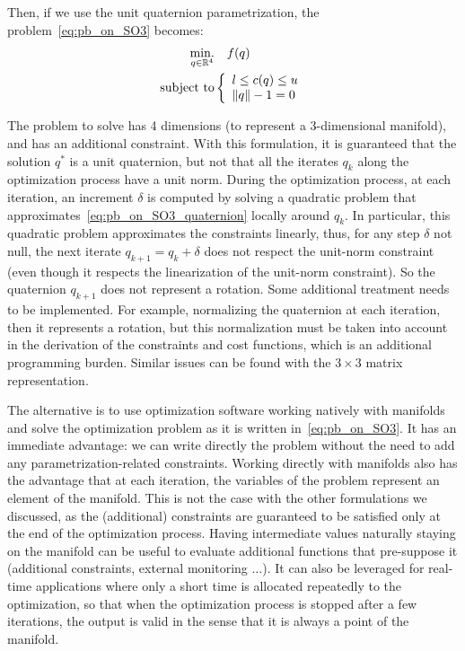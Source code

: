 Then, if we use the unit quaternion parametrization, the problem~\ref{eq:pb_on_SO3} becomes:
\begin{align}
\label{eq:pb_on_SO3_quaternion}
  \operatorname*{min.}_{q \in \mathbb{R}^4} & \quad f(q)\\
  \text{subject to}&
  \left\{\begin{array}{lr}
    {l} \leq c(q) \leq {u} \nonumber\\
    \|q\| - 1 = 0
  \end{array}\right.
\end{align}

The problem to solve has 4 dimensions (to represent a 3-dimensional manifold), and has an additional constraint.
With this formulation, it is guaranteed that the solution $q^*$ is a unit quaternion, but not that all the iterates $q_k$ along the optimization process have a unit norm.
During the optimization process, at each iteration, an increment $\delta$ is computed by solving a quadratic problem that approximates~\ref{eq:pb_on_SO3_quaternion} locally around $q_k$.
In particular, this quadratic problem approximates the constraints linearly, thus, for any step $\delta$ not null, the next iterate $q_{k+1} = q_k + \delta$ does not respect the unit-norm constraint (even though it respects the linearization of the unit-norm constraint).
So the quaternion $q_{k+1}$ does not represent a rotation.
Some additional treatment needs to be implemented.
For example, normalizing the quaternion at each iteration, then it represents a rotation, but this normalization must be taken into account in the derivation of the constraints and cost functions, which is an additional programming burden.
Similar issues can be found with the $3\times 3$ matrix representation.

The alternative is to use optimization software working natively with manifolds~\cite{brossette:Humanoids:2015}\cite{absil:book:2008} and solve the optimization problem as it is written in~\ref{eq:pb_on_SO3}.
It has an immediate advantage: we can write directly the problem without the need to add any parametrization-related constraints.
Working directly with manifolds also has the advantage that at each iteration, the variables of the problem represent an element of the manifold.
This is not the case with the other formulations we discussed, as the (additional) constraints are guaranteed to be satisfied only at the end of the optimization process.
Having intermediate values naturally staying on the manifold can be useful to evaluate additional functions that pre-suppose it (additional constraints, external monitoring $\ldots$).
It can also be leveraged for real-time applications where only a short time is allocated repeatedly to the optimization, so that when the optimization process is stopped after a few iterations, the output is valid in the sense that it is always a point of the manifold.


